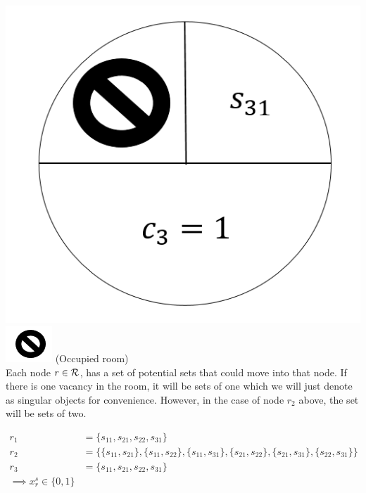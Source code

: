 \documentclass[12pt]{article}
\begin{document}
\includegraphics[scale=0.25]{c3}
\includegraphics[scale=0.5]{symbol}
(Occupied room)\\

Each node $r\in{\cal R}$, has a set of potential sets that could move into that node. If there is one vacancy in the room, it will be sets of one which we will just denote as singular objects for convenience. However, in the case of node $r_2$ above, the set will be sets of two.

\begin{align*}
r_1&= \{s_{11}, s_{21}, s_{22},s_{31}\}\\
r_2&= \{\{s_{11}, s_{21}\}, \{s_{11},s_{22}\},\{s_{11},s_{31}\},  \{s_{21},s_{22}\}, \{s_{21},s_{31}\},  \{s_{22},s_{31}\} \}\\
r_3&= \{s_{11}, s_{21}, s_{22},s_{31}\}\\
\implies x_r^s \in \{0, 1\}
\end{align*}

\end{document}
